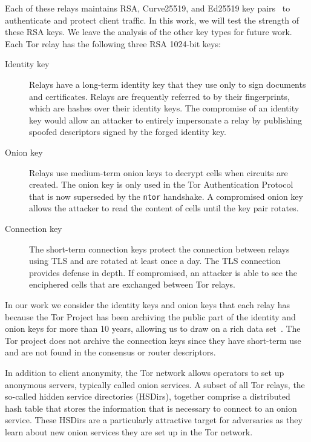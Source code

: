 Each of these relays maintains RSA, Curve25519, and Ed25519 key
pairs~\cite[\S~1.1]{torspec} to authenticate and protect client traffic. In this
work, we will test the strength of these RSA keys.  We leave the analysis of the
other key types for future work.  Each Tor relay has the following three RSA
1024-bit keys:

\begin{description}
    \item[Identity key] Relays have a long-term identity key that they use only
      to sign documents and certificates.  Relays are frequently referred to by
      their fingerprints, which are hashes over their identity keys.  The
      compromise of an identity key would allow an attacker to entirely
      impersonate a relay by publishing spoofed descriptors signed by the
      forged identity key.

    \item[Onion key]  Relays use medium-term onion keys to decrypt cells when
        circuits are created.  The onion key is only used in the Tor
        Authentication Protocol that is now superseded by the \texttt{ntor} 
        handshake.  A compromised onion key allows the attacker to read 
        the content of cells until the key pair rotates.

    \item[Connection key] The short-term connection keys protect the connection
        between relays using TLS and are rotated at least once a
        day.  The TLS connection provides defense in depth.  If compromised, an
        attacker is able to see the enciphered cells that are exchanged between Tor
        relays.
\end{description}

In our work we consider the identity keys and onion keys that each relay 
has because the Tor Project has been archiving the public part of the 
identity and onion keys for more than 10 years, allowing us to draw on a 
rich data set~\cite{collector}. The Tor project does not archive the 
connection keys since they have short-term use and are not found
in the consensus or router descriptors.

In addition to client anonymity, the Tor network allows operators to set up
anonymous servers, typically called onion services.  A subset of all Tor relays,
the so-called hidden service directories (HSDirs), together comprise a
distributed hash table that stores the information that is necessary to connect
to an onion service.  These HSDirs are a particularly attractive target for
adversaries as they learn about new onion services they are set up in the Tor
network.
